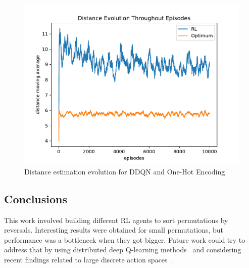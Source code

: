 \documentclass[11pt,twoside]{article}
\begin{document}
\begin{figure}[H]
	\begin{center}
		\includegraphics[scale=0.8]{charts/dist_evolution.pdf}
		\caption{Distance estimation evolution for DDQN and One-Hot Encoding}
		\label{chart:dist_evolution}
	\end{center}
\end{figure}

\subsection{Conclusions}\label{conclusions}

This work involved building different RL agents to sort permutations by reversals. Interesting results were obtained for small permutations, but performance was a bottleneck when they got bigger. Future work could try to address that by using distributed deep Q-learning methods~\cite{dist_dqnn1, dist_dqnn2} and considering recent findings related to large discrete action spaces~\cite{large_space}.



\end{document}
